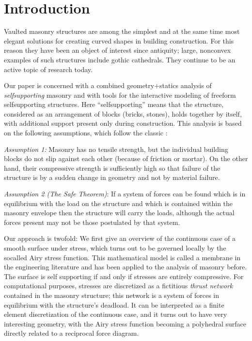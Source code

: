 \documentclass[review]{acmsiggraph}
\begin{document}

\copyrightspace



\section{Introduction}


Vaulted masonry structures are among the simplest and at the same time
most elegant solutions for creating curved shapes in building
construction. For this reason they have been an object of interest
since antiquity; large, non\dash convex examples of such structures include gothic
cathedrals. They continue to be an active topic of research today.


Our paper is concerned with a combined geometry+statics analysis of {\em
self\dash supporting} masonry and with tools for the interactive modeling
of freeform self\dash supporting structures. Here ``self\dash supporting''
means that the structure, considered as an arrangement of blocks (bricks,
stones), holds together by itself, with additional support present only during
construction. This analysis is based on the following assumptions, which
follow the classic \cite{Heyman66}:


{\it Assumption 1:} Masonry has no tensile strength, but the individual
building blocks do not slip against each other (because of friction or
mortar). On the other hand, their compressive strength is sufficiently
high so that failure of the structure is by a sudden change in geometry
and not by material failure.

{\it Assumption 2 (The Safe Theorem)}: If a system of forces can be found
which is in equilibrium with the load on the structure and which is
contained within the masonry envelope then the structure will carry the
loads, although the actual forces present may not be those postulated by
that system.

Our approach is twofold: We first give an overview of the continuous case
of a smooth surface under stress, which turns out to be governed locally by the
so\dash called Airy stress function. This mathematical
model is called a membrane in the engineering literature and has been
applied to the analysis of masonry before. The surface is self\dash
supporting if and only if stresses are entirely compressive.
For computational purposes, stresses are
discretized as a fictitious {\em thrust network} \cite{Block07} contained
in the masonry structure; this network is a system of forces in equilibrium with
the structure's deadload. It can be interpreted as a
finite element discretization of the continuous case, and it turns out to
have very interesting geometry, with the Airy stress function becoming a
polyhedral surface directly related to a reciprocal force diagram.
\end{document}

